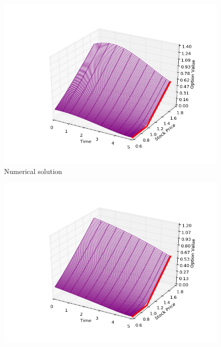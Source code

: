 \documentclass[11pt,a4paper]{extarticle}
\begin{document}
\begin{minipage}{\linewidth}
      \centering
      \begin{minipage}{0.29\linewidth}
          \begin{figure}[H]
              \includegraphics[width=\linewidth]{Figures/eu-call-num}
              \caption{Numerical solution}
          \end{figure}
      \end{minipage}
      \hspace{0.04\linewidth}
      \begin{minipage}{0.29\linewidth}
          \begin{figure}[H]
              \includegraphics[width=\linewidth]{Figures/eu-call-analyt}

\end{figure}
\end{minipage}
\end{minipage}
\end{document}
